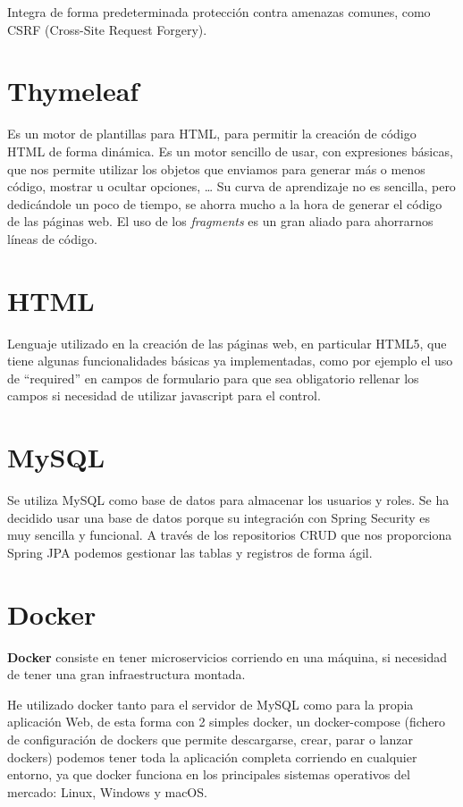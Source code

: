 Integra de forma predeterminada protección contra amenazas comunes, como CSRF (Cross-Site Request Forgery).

\section{Thymeleaf}

Es un motor de plantillas para HTML, para permitir la creación de código HTML de forma dinámica.
Es un motor sencillo de usar, con expresiones básicas, que nos permite utilizar los objetos que enviamos para generar más o menos código, mostrar u ocultar opciones, \dots
Su curva de aprendizaje no es sencilla, pero dedicándole un poco de tiempo, se ahorra mucho a la hora de generar el código de las páginas web.
El uso de los \textit{fragments} es un gran aliado para ahorrarnos líneas de código.

\section{HTML}

Lenguaje utilizado en la creación de las páginas web, en particular HTML5, que tiene algunas funcionalidades básicas ya implementadas, como por ejemplo el uso de ``required'' en campos de formulario para que sea obligatorio rellenar los campos si necesidad de utilizar javascript para el control.

\section{MySQL}

Se utiliza MySQL como base de datos para almacenar los usuarios y roles.
Se ha decidido usar una base de datos porque su integración con Spring Security es muy sencilla y funcional. 
A través de los repositorios CRUD que nos proporciona Spring JPA podemos gestionar las tablas y registros de forma ágil.

\section{Docker}

\textbf{Docker} consiste en tener microservicios corriendo en una máquina, si necesidad de tener una gran infraestructura montada.

He utilizado docker tanto para el servidor de MySQL como para la propia aplicación Web, de esta forma con 2 simples docker, un docker-compose (fichero de configuración de dockers que permite descargarse, crear, parar o lanzar dockers) podemos tener toda la aplicación completa corriendo en cualquier entorno, ya que docker funciona en los principales sistemas operativos del mercado: Linux, Windows y macOS.

